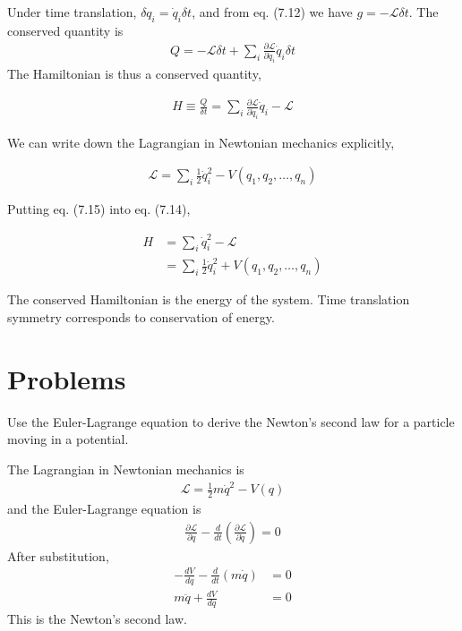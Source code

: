 \documentclass[12pt]{book} %
\numberwithin{equation}{chapter}
\def\d{\delta}
\def\La{\mathcal{L}}
\def\p{\partial}
\begin{document}
\begin{example}
Under time translation, $\d q_{i}=\dot{q}_{i}\d t$, and from eq. (7.12) we have $g=-\La \d t$. The conserved quantity is
\begin{align*}
Q=-\La \d t+\sum_{i}\frac{\p \La}{\p \dot{q}_{i}}\dot{q}_{i}\d t
\end{align*}
The Hamiltonian is thus a conserved quantity,
\begin{eqnbox}
\begin{align}
H\equiv\frac{Q}{\d t}=\sum_{i}\frac{\p \La}{\p \dot{q}_{i}}\dot{q}_{i}-\La
\end{align}
\end{eqnbox}
We can write down the Lagrangian in Newtonian mechanics explicitly,
\begin{eqnbox}
\begin{align}
\La=\sum_{i}\frac{1}{2}\dot{q}_{i}^{2}-V(q_{1}, q_{2}, \dots, q_{n})
\end{align}
\end{eqnbox}
Putting eq. (7.15) into eq. (7.14),
\begin{eqnbox}
\begin{align}
H&=\sum_{i}\dot{q}_{i}^{2}-\La\nonumber\\
&=\sum_{i}\frac{1}{2}\dot{q}_{i}^{2}+V(q_{1}, q_{2}, \dots, q_{n})
\end{align}
\end{eqnbox}
The conserved Hamiltonian is the energy of the system. Time translation symmetry corresponds to conservation of energy.
\end{example}

\section*{Problems}
\begin{problem}
Use the Euler-Lagrange equation to derive the Newton's second law for a particle moving in a potential.
\end{problem}

\begin{solbox}
The Lagrangian in Newtonian mechanics is
\begin{align*}
\La=\frac{1}{2}m\dot{q}^{2}-V(q)
\end{align*}
and the Euler-Lagrange equation is
\begin{align*}
\frac{\p \La}{\p q}-\frac{d}{dt}\left(\frac{\p \La}{\p \dot{q}}\right)=0
\end{align*}
After substitution,
\begin{align*}
-\frac{dV}{dq}-\frac{d}{dt}\left(m\dot{q}\right)&=0\\
m\ddot{q}+\frac{dV}{dq}&=0
\end{align*}
This is the Newton's second law.
\end{solbox}
\end{document}
